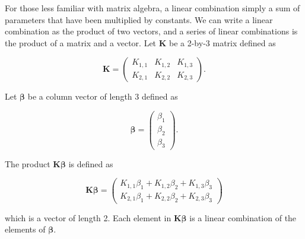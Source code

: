 \documentclass[
  letterpaper,
  DIV=11,
  numbers=noendperiod]{scrreprt}
\theoremstyle{definition}
\theoremstyle{definition}
\theoremstyle{remark}
\begin{document}
\begin{tcolorbox}[enhanced jigsaw, left=2mm, toprule=.15mm, arc=.35mm, breakable, opacitybacktitle=0.6, opacityback=0, rightrule=.15mm, colbacktitle=quarto-callout-note-color!10!white, coltitle=black, leftrule=.75mm, toptitle=1mm, colframe=quarto-callout-note-color-frame, titlerule=0mm, title=\textcolor{quarto-callout-note-color}{\faInfo}\hspace{0.5em}{Note}, bottomrule=.15mm, colback=white, bottomtitle=1mm]

For those less familiar with matrix algebra, a linear combination simply
a sum of parameters that have been multiplied by constants. We can write
a linear combination as the product of two vectors, and a series of
linear combinations is the product of a matrix and a vector. Let
\(\mathbf{K}\) be a 2-by-3 matrix defined as

\[\mathbf{K} = \begin{pmatrix} 
   K_{1,1} & K_{1,2} & K_{1,3} \\
   K_{2,1} & K_{2,2} & K_{2,3} \end{pmatrix}.\]

Let \(\boldsymbol{\beta}\) be a column vector of length 3 defined as

\[\boldsymbol{\beta} = \begin{pmatrix}
   \beta_1 \\
   \beta_2 \\
   \beta_3 \end{pmatrix}.\]

The product \(\mathbf{K} \boldsymbol{\beta}\) is defined as

\[\mathbf{K}\boldsymbol{\beta} = \begin{pmatrix}
   K_{1,1} \beta_1 + K_{1,2} \beta_2 + K_{1,3} \beta_3 \\
   K_{2,1} \beta_1 + K_{2,2} \beta_2 + K_{2,3} \beta_3 \end{pmatrix}\]

which is a vector of length 2. Each element in
\(\mathbf{K}\boldsymbol{\beta}\) is a linear combination of the elements
of \(\boldsymbol{\beta}\).

\end{tcolorbox}
\end{document}
